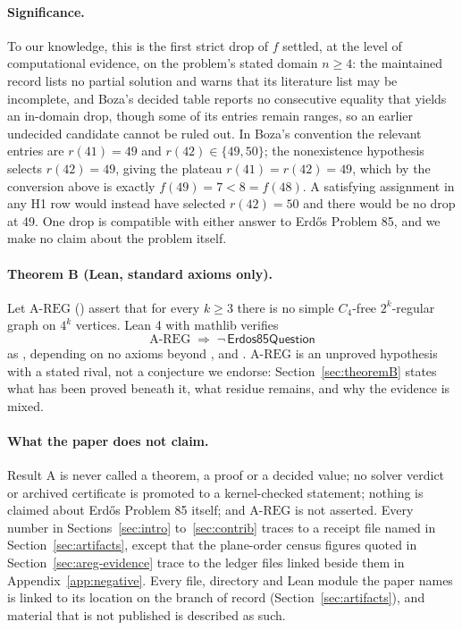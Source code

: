 \documentclass{anvil-paper}
\newcommand{\AREG}{\mathrm{A\text{-}REG}}
\newcommand{\Qn}{\textsf{Erdos85Question}}
\theoremstyle{definition}
\begin{document}
\paragraph{Significance.} To our knowledge, this is the first strict drop of $f$ settled, at the level of computational evidence, on the problem's stated domain $n\ge 4$: the maintained record \citep{bloom-erdos85} lists no partial solution and warns that its literature list may be incomplete, and Boza's decided table \citep{boza2024ramsey} reports no consecutive equality that yields an in-domain drop, though some of its entries remain ranges, so an earlier undecided candidate cannot be ruled out. In Boza's convention the relevant entries are $r(41)=49$ and $r(42)\in\{49,50\}$; the nonexistence hypothesis selects $r(42)=49$, giving the plateau $r(41)=r(42)=49$, which by the conversion above is exactly $f(49)=7<8=f(48)$. A satisfying assignment in any H1 row would instead have selected $r(42)=50$ and there would be no drop at 49. One drop is compatible with either answer to Erdős Problem 85, and we make no claim about the problem itself.

\paragraph{Theorem B (Lean, standard axioms only).} Let $\AREG$ () assert that for every $k\ge 3$ there is no simple $C_4$-free $2^k$-regular graph on $4^k$ vertices. Lean 4 \citep{moura2021lean4} with mathlib \citep{mathlib2020} verifies
\[
\AREG \;\Rightarrow\; \neg\,\Qn
\]
as , depending on no axioms beyond ,  and . $\AREG$ is an unproved hypothesis with a stated rival, not a conjecture we endorse: Section~\ref{sec:theoremB} states what has been proved beneath it, what residue remains, and why the evidence is mixed.

\paragraph{What the paper does not claim.} Result A is never called a theorem, a proof or a decided value; no solver verdict or archived certificate is promoted to a kernel-checked statement; nothing is claimed about Erdős Problem 85 itself; and $\AREG$ is not asserted. Every number in Sections~\ref{sec:intro} to~\ref{sec:contrib} traces to a receipt file named in Section~\ref{sec:artifacts}, except that the plane-order census figures quoted in Section~\ref{sec:areg-evidence} trace to the ledger files linked beside them in Appendix~\ref{app:negative}. Every file, directory and Lean module the paper names is linked to its location on the branch of record (Section~\ref{sec:artifacts}), and material that is not published is described as such.
\end{document}
